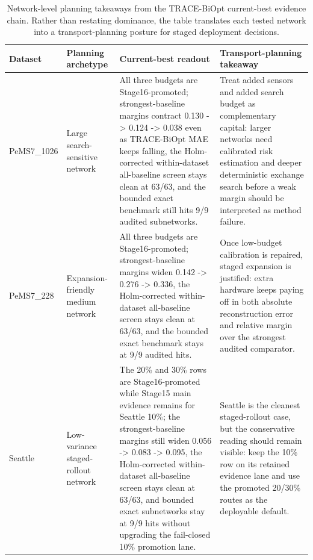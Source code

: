 \begin{table}[pos=htbp]
\centering
\caption{Network-level planning takeaways from the TRACE-BiOpt current-best evidence chain. Rather than restating dominance, the table translates each tested network into a transport-planning posture for staged deployment decisions.}
\label{tab:trace-biopt-planning-takeaways}
\scriptsize
\begin{tabularx}{\textwidth}{>{\raggedright\arraybackslash}p{}>{\raggedright\arraybackslash}p{}>{\raggedright\arraybackslash}p{}>{\raggedright\arraybackslash}X}
\toprule
Dataset & Planning archetype & Current-best readout & Transport-planning takeaway \\
\midrule
PeMS7\_1026 & Large search-sensitive network & All three budgets are Stage16-promoted; strongest-baseline margins contract 0.130 -> 0.124 -> 0.038 even as TRACE-BiOpt MAE keeps falling, the Holm-corrected within-dataset all-baseline screen stays clean at 63/63, and the bounded exact benchmark still hits 9/9 audited subnetworks. & Treat added sensors and added search budget as complementary capital: larger networks need calibrated risk estimation and deeper deterministic exchange search before a weak margin should be interpreted as method failure. \\
PeMS7\_228 & Expansion-friendly medium network & All three budgets are Stage16-promoted; strongest-baseline margins widen 0.142 -> 0.276 -> 0.336, the Holm-corrected within-dataset all-baseline screen stays clean at 63/63, and the bounded exact benchmark stays at 9/9 audited hits. & Once low-budget calibration is repaired, staged expansion is justified: extra hardware keeps paying off in both absolute reconstruction error and relative margin over the strongest audited comparator. \\
Seattle & Low-variance staged-rollout network & The 20\% and 30\% rows are Stage16-promoted while Stage15 main evidence remains for Seattle 10\%; the strongest-baseline margins still widen 0.056 -> 0.083 -> 0.095, the Holm-corrected within-dataset all-baseline screen stays clean at 63/63, and bounded exact subnetworks stay at 9/9 hits without upgrading the fail-closed 10\% promotion lane. & Seattle is the cleanest staged-rollout case, but the conservative reading should remain visible: keep the 10\% row on its retained evidence lane and use the promoted 20/30\% routes as the deployable default. \\
\bottomrule
\end{tabularx}
\end{table}
